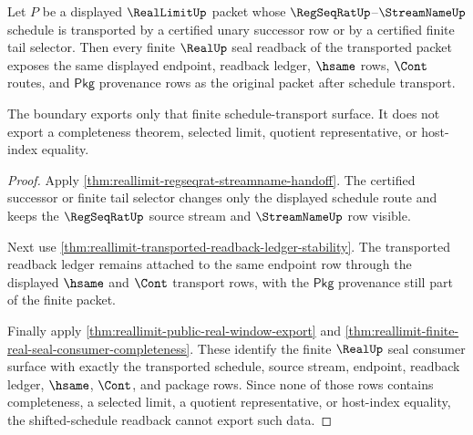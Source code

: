 \begin{theorem}
\label{thm:reallimit-shifted-schedule-readback-boundary}
Let $P$ be a displayed $\RealLimitUp$ packet whose
$\RegSeqRatUp$--$\StreamNameUp$ schedule is transported by a certified unary
successor row or by a certified finite tail selector. Then every finite
$\RealUp$ seal readback of the transported packet exposes the same displayed
endpoint, readback ledger, $\hsame$ rows, $\Cont$ routes, and $\mathsf{Pkg}$
provenance rows as the original packet after schedule transport.

The boundary exports only that finite schedule-transport surface. It does not
export a completeness theorem, selected limit, quotient representative, or
host-index equality.
\end{theorem}
\begin{proof}
Apply \autoref{thm:reallimit-regseqrat-streamname-handoff}. The certified
successor or finite tail selector changes only the displayed schedule route and
keeps the $\RegSeqRatUp$ source stream and $\StreamNameUp$ row visible.

Next use
\autoref{thm:reallimit-transported-readback-ledger-stability}. The transported
readback ledger remains attached to the same endpoint row through the displayed
$\hsame$ and $\Cont$ transport rows, with the $\mathsf{Pkg}$ provenance still
part of the finite packet.

Finally apply \autoref{thm:reallimit-public-real-window-export} and
\autoref{thm:reallimit-finite-real-seal-consumer-completeness}. These identify
the finite $\RealUp$ seal consumer surface with exactly the transported
schedule, source stream, endpoint, readback ledger, $\hsame$, $\Cont$, and
package rows. Since none of those rows contains completeness, a selected limit,
a quotient representative, or host-index equality, the shifted-schedule readback
cannot export such data.
\end{proof}


